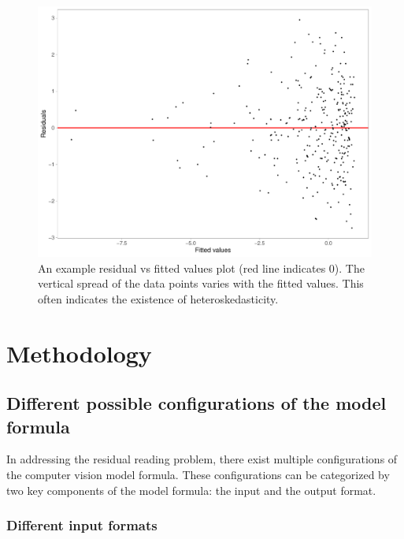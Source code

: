 \documentclass[]{interact}
\theoremstyle{plain}%
\theoremstyle{definition}
\theoremstyle{remark}
\begin{document}
\begin{figure}

{\centering \includegraphics[width=1\linewidth]{paper_files/figure-latex/false-finding-1} 

}

\caption{An example residual vs fitted values plot (red line indicates 0). The vertical spread of the data points varies with the fitted values. This often indicates the existence of heteroskedasticity.}\label{fig:false-finding}
\end{figure}

\hypertarget{methodology}{%
\section{Methodology}\label{methodology}}

\hypertarget{different-possible-configurations-of-the-model-formula}{%
\subsection{Different possible configurations of the model
formula}\label{different-possible-configurations-of-the-model-formula}}

In addressing the residual reading problem, there exist multiple
configurations of the computer vision model formula. These
configurations can be categorized by two key components of the model
formula: the input and the output format.

\hypertarget{different-input-formats}{%
\subsubsection{Different input formats}\label{different-input-formats}}
\end{document}
